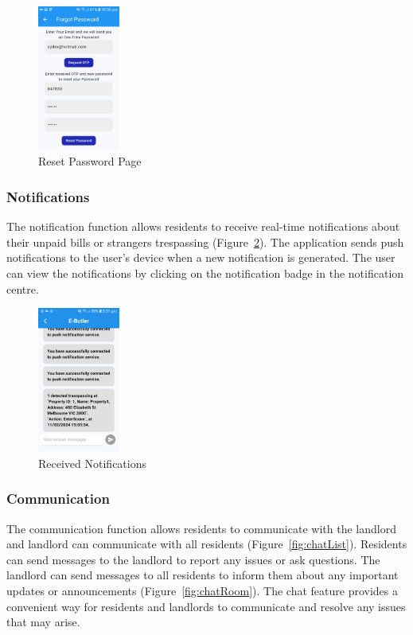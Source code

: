 \documentclass[sigconf]{acmart}
\begin{document}
\begin{figure}[h]
  \centering
  \includegraphics[width=0.24\textwidth]{resetPassword.jpg}
  \caption{Reset Password Page}
  \label{fig:resetPassword}
\end{figure}

\subsubsection{Notifications}
The notification function allows residents to receive real-time notifications about their unpaid bills or strangers trespassing (Figure~\ref{fig:warnings}). The application sends push notifications to the user's device when a new notification is generated. The user can view the notifications by clicking on the notification badge in the notification centre.

\begin{figure}[h]
  \centering
  \includegraphics[width=0.24\textwidth]{onlyRecceiveWarnings.jpg}
  \caption{Received Notifications}
  \label{fig:warnings}
\end{figure}

\subsubsection{Communication}
The communication function allows residents to communicate with the landlord and landlord can communicate with all residents (Figure~\ref{fig:chatList}). Residents can send messages to the landlord to report any issues or ask questions. The landlord can send messages to all residents to inform them about any important updates or announcements (Figure~\ref{fig:chatRoom}). The chat feature provides a convenient way for residents and landlords to communicate and resolve any issues that may arise.
\end{document}
